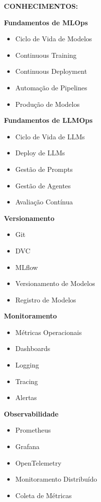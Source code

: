 \textbf{CONHECIMENTOS:}

\textbf{Fundamentos de MLOps}

\begin{itemize}
\item Ciclo de Vida de Modelos
\item Continuous Training
\item Continuous Deployment
\item Automação de Pipelines
\item Produção de Modelos
\end{itemize}

\textbf{Fundamentos de LLMOps}

\begin{itemize}
\item Ciclo de Vida de LLMs
\item Deploy de LLMs
\item Gestão de Prompts
\item Gestão de Agentes
\item Avaliação Contínua
\end{itemize}

\textbf{Versionamento}

\begin{itemize}
\item Git
\item DVC
\item MLflow
\item Versionamento de Modelos
\item Registro de Modelos
\end{itemize}

\textbf{Monitoramento}

\begin{itemize}
\item Métricas Operacionais
\item Dashboards
\item Logging
\item Tracing
\item Alertas
\end{itemize}

\textbf{Observabilidade}

\begin{itemize}
\item Prometheus
\item Grafana
\item OpenTelemetry
\item Monitoramento Distribuído
\item Coleta de Métricas
\end{itemize}

